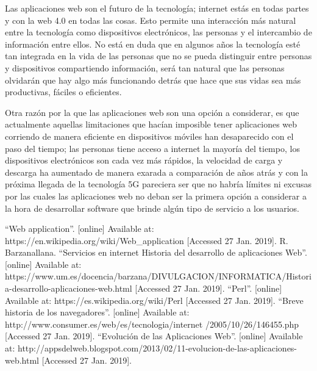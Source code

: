 \documentclass{article}
\begin{document}
Las aplicaciones web son el futuro de la tecnología; internet estás en todas
partes y con la web 4.0 en todas las cosas. Esto permite una interacción más
natural entre la tecnología como dispositivos electrónicos, las
personas y el intercambio de información entre ellos. No está en duda que en
algunos años la tecnología esté tan integrada en la vida de las personas que no
se pueda distinguir entre personas y dispositivos compartiendo información, será
tan natural que las personas olvidarán que hay algo más funcionando detrás
que hace que sus vidas sea más productivas, fáciles o eficientes.

Otra razón por la que las aplicaciones web son una opción a considerar, es que
actualmente aquellas limitaciones que hacían imposible tener aplicaciones web
corriendo de manera eficiente en dispositivos móviles han desaparecido con el
paso del tiempo; las personas tiene acceso a internet la mayoría del tiempo, los
dispositivos electrónicos son cada vez más rápidos, la velocidad de carga y
descarga ha aumentado de manera exarada a comparación de años atrás y con la
próxima llegada de la tecnología 5G pareciera ser que no habría límites ni
excusas por las cuales las aplicaciones web no deban ser la primera opción a
considerar a la hora de desarrollar software que brinde algún tipo de servicio
a los usuarios.

\begin{thebibliography}{}
	``Web application''. [online]
	Available at: https://en.wikipedia.org/wiki/Web\_application
	[Accessed 27 Jan. 2019].
	R. Barzanallana. ``Servicios en internet Historia del desarrollo de aplicaciones Web''.
	[online] Available at: https://www.um.es/docencia/barzana/DIVULGACION/INFORMATICA/Historia-desarrollo-aplicaciones-web.html
	[Accessed 27 Jan. 2019].
	``Perl''. [online]
	Available at: https://es.wikipedia.org/wiki/Perl
	[Accessed 27 Jan. 2019].
	``Breve historia de los navegadores''. [online]
	Available at: http://www.consumer.es/web/es/tecnologia/internet
	/2005/10/26/146455.php
	[Accessed 27 Jan. 2019].
	``Evolución de las Aplicaciones Web''. [online]
	Available at: http://appsdelweb.blogspot.com/2013/02/11-evolucion-de-las-aplicaciones-web.html
	[Accessed 27 Jan. 2019].
\end{thebibliography}
\end{document}
